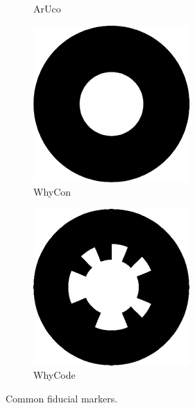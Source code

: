 \begin{figure}[ht]
\begin{subfigure}[b]{0.16\textwidth}
        \caption{ArUco}
        \label{subfig:aruco}
    \end{subfigure}
    \begin{subfigure}[b]{0.16\textwidth}
        \centering
        \includegraphics[width=\textwidth]{images/whycon_example.png}
        \caption{WhyCon}
        \label{subfig:whycon}
    \end{subfigure}
    \begin{subfigure}[b]{0.16\textwidth}
        \centering
        \includegraphics[width=\textwidth]{images/whycode_example.png}
        \caption{WhyCode}
        \label{subfig:whycode}
    \end{subfigure}
    \caption{Common fiducial markers.}
    \label{fig:fiducial_markers}
\end{figure}

